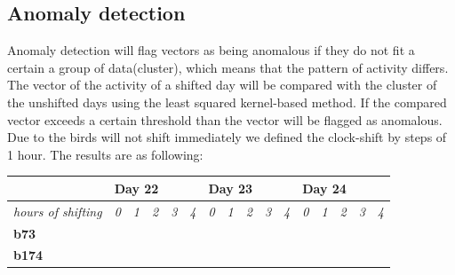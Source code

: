 \documentclass[a4paper]{article}
\begin{document}
\subsection*{Anomaly detection}
Anomaly detection will flag vectors as being anomalous if they do not fit a certain a group of data(cluster), which means that the pattern of activity differs. The vector of the activity of a shifted day will be compared with the cluster of the unshifted days using the least squared kernel-based method. If the compared vector exceeds a certain threshold than the vector will be flagged as anomalous. Due to the birds will not shift immediately we defined the clock-shift by steps of 1 hour. The results are as following:\\
\begin{table}[H]
\centering
\begin{tabular}{llllllllllllllll}
\hline
\multicolumn{1}{|l|}{} & \multicolumn{5}{l|}{\textbf{Day 22}} & \multicolumn{5}{l|}{\textbf{Day 23}} & \multicolumn{5}{l|}{\textbf{Day 24}} \\ \hline
\multicolumn{1}{|l|}{\textit{hours of shifting}} & \multicolumn{1}{l|}{\textit{0}} & \multicolumn{1}{l|}{\textit{1}} & \multicolumn{1}{l|}{\textit{2}} & \multicolumn{1}{l|}{\textit{3}} & \multicolumn{1}{l|}{\textit{4}} & \multicolumn{1}{l|}{\textit{0}} & \multicolumn{1}{l|}{\textit{1}} & \multicolumn{1}{l|}{\textit{2}} & \multicolumn{1}{l|}{\textit{3}} & \multicolumn{1}{l|}{\textit{4}} & \multicolumn{1}{l|}{\textit{0}} & \multicolumn{1}{l|}{\textit{1}} & \multicolumn{1}{l|}{\textit{2}} & \multicolumn{1}{l|}{\textit{3}} & \multicolumn{1}{l|}{\textit{4}} \\ \hline
\multicolumn{1}{|l|}{\textbf{b73}} & \multicolumn{1}{l|}{\cellcolor[HTML]{67FD9A}} & \multicolumn{1}{l|}{\cellcolor[HTML]{67FD9A}} & \multicolumn{1}{l|}{\cellcolor[HTML]{67FD9A}} & \multicolumn{1}{l|}{\cellcolor[HTML]{67FD9A}} & \multicolumn{1}{l|}{\cellcolor[HTML]{67FD9A}} & \multicolumn{1}{l|}{\cellcolor[HTML]{67FD9A}} & \multicolumn{1}{l|}{\cellcolor[HTML]{67FD9A}} & \multicolumn{1}{l|}{\cellcolor[HTML]{67FD9A}} & \multicolumn{1}{l|}{\cellcolor[HTML]{67FD9A}} & \multicolumn{1}{l|}{\cellcolor[HTML]{67FD9A}} & \multicolumn{1}{l|}{\cellcolor[HTML]{FD6864}} & \multicolumn{1}{l|}{\cellcolor[HTML]{67FD9A}} & \multicolumn{1}{l|}{\cellcolor[HTML]{FD6864}} & \multicolumn{1}{l|}{\cellcolor[HTML]{FD6864}} & \multicolumn{1}{l|}{\cellcolor[HTML]{FD6864}} \\ \hline
\multicolumn{1}{|l|}{\textbf{b174}} & \multicolumn{1}{l|}{\cellcolor[HTML]{FD6864}} & \multicolumn{1}{l|}{\cellcolor[HTML]{FD6864}} & \multicolumn{1}{l|}{\cellcolor[HTML]{FD6864}} & \multicolumn{1}{l|}{\cellcolor[HTML]{FD6864}} & \multicolumn{1}{l|}{\cellcolor[HTML]{FD6864}} & \multicolumn{1}{l|}{\cellcolor[HTML]{FD6864}} & \multicolumn{1}{l|}{\cellcolor[HTML]{67FD9A}} & \multicolumn{1}{l|}{\cellcolor[HTML]{67FD9A}} & \multicolumn{1}{l|}{\cellcolor[HTML]{67FD9A}} & \multicolumn{1}{l|}{\cellcolor[HTML]{FD6864}} & \multicolumn{1}{l|}{\cellcolor[HTML]{67FD9A}} & \multicolumn{1}{l|}{\cellcolor[HTML]{67FD9A}} & \multicolumn{1}{l|}{\cellcolor[HTML]{67FD9A}} & \multicolumn{1}{l|}{\cellcolor[HTML]{67FD9A}} & \multicolumn{1}{l|}{\cellcolor[HTML]{67FD9A}} \\ \hline

\end{tabular}
\end{table}
\end{document}
